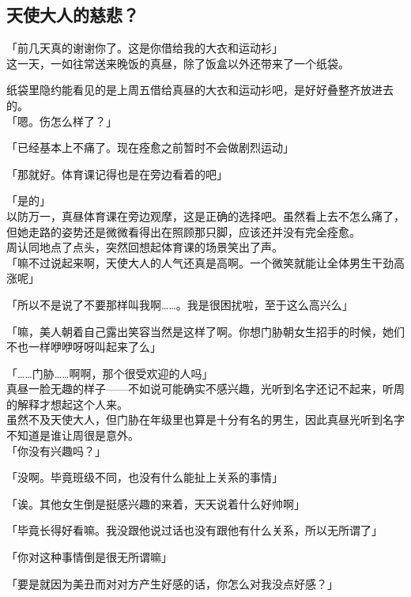 \subsection{天使大人的慈悲？}

「前几天真的谢谢你了。这是你借给我的大衣和运动衫」\\

这一天，一如往常送来晚饭的真昼，除了饭盒以外还带来了一个纸袋。

纸袋里隐约能看见的是上周五借给真昼的大衣和运动衫吧，是好好叠整齐放进去的。\\

「嗯。伤怎么样了？」

「已经基本上不痛了。现在痊愈之前暂时不会做剧烈运动」

「那就好。体育课记得也是在旁边看着的吧」

「是的」\\

以防万一，真昼体育课在旁边观摩，这是正确的选择吧。虽然看上去不怎么痛了，但她走路的姿势还是微微看得出在照顾那只脚，应该还并没有完全痊愈。\\

周认同地点了点头，突然回想起体育课的场景笑出了声。\\

「嘛不过说起来啊，天使大人的人气还真是高啊。一个微笑就能让全体男生干劲高涨呢」

「所以不是说了不要那样叫我啊……。我是很困扰啦，至于这么高兴么」

「嘛，美人朝着自己露出笑容当然是这样了啊。你想门胁朝女生招手的时候，她们不也一样咿咿呀呀叫起来了么」

「……门胁……啊啊，那个很受欢迎的人吗」\\

真昼一脸无趣的样子——不如说可能确实不感兴趣，光听到名字还记不起来，听周的解释才想起这个人来。\\

虽然不及天使大人，但门胁在年级里也算是十分有名的男生，因此真昼光听到名字不知道是谁让周很是意外。\\

「你没有兴趣吗？」

「没啊。毕竟班级不同，也没有什么能扯上关系的事情」

「诶。其他女生倒是挺感兴趣的来着，天天说着什么好帅啊」

「毕竟长得好看嘛。我没跟他说过话也没有跟他有什么关系，所以无所谓了」

「你对这种事情倒是很无所谓嘛」

「要是就因为美丑而对对方产生好感的话，你怎么对我没点好感？」

